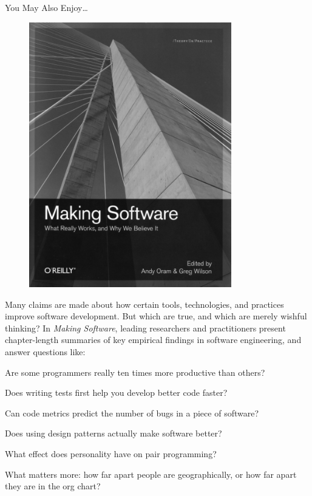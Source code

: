 
\thispagestyle{empty}

\sffamily

\Large You May Also Enjoy\ldots

\normalsize

\begin{figure}[h!]
\centering
\includegraphics[width=250pt]{../images/backmatter/making.pdf}
\end{figure}

Many claims are made about how certain tools, technologies, and
practices improve software development. But which are true, and which
are merely wishful thinking? In \emph{Making Software}, leading
researchers and practitioners present chapter-length summaries of key
empirical findings in software engineering, and answer questions like:

\vspace{-0.1cm}

\begin{aosaitemize}

\item Are some programmers really ten times more productive than others?

\item Does writing tests first help you develop better code faster?

\item Can code metrics predict the number of bugs in a piece of software?

\item Does using design patterns actually make software better?

\item What effect does personality have on pair programming?

\item What matters more: how far apart people are geographically, or how far apart they are in the org chart?

\end{aosaitemize}

